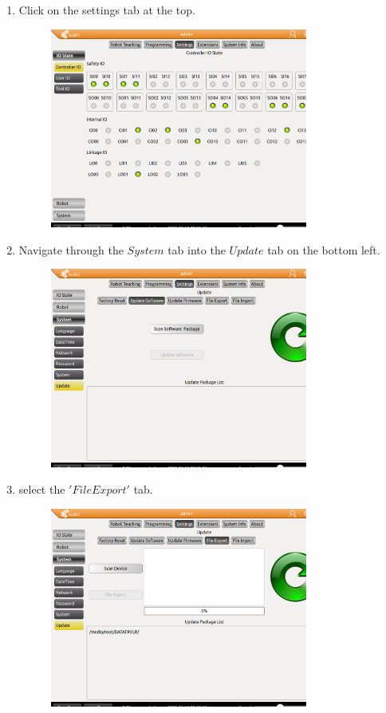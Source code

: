 \documentclass{article}
\begin{document}
\begin{enumerate}
\item Click on the settings tab at the top. 
\begin{figure}[H]\centering
  \includegraphics[width=0.8\textwidth]{../../Images/settings.png}
\end{figure}
\item Navigate through the $System$ tab into the $Update$ tab on the bottom left. 
\begin{figure}[H]\centering
  \includegraphics[width=0.8\textwidth]{../../Images/update.png}
\end{figure}
\item select the $'File Export'$ tab. 
\begin{figure}[H]\centering
  \includegraphics[width=0.8\textwidth]{../../Images/FileExport.png}

\end{figure}
\end{enumerate}
\end{document}
